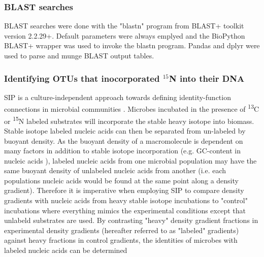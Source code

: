 \subsubsection{BLAST searches}
BLAST searches were done with the "blastn" program from BLAST+ toolkit \cite{20003500} version 2.2.29+. Default parameters were always emplyed and the BioPython \cite{19304878} BLAST+ wrapper was used to invoke the blastn program. Pandas \cite{citeulike:11241428} and dplyr \cite{dplyr} were used to parse and munge BLAST output tables.  

\subsubsection{Identifying OTUs that inocorporated $^{15}$N into their DNA}
SIP is a culture-independent approach towards defining identity-function connections in microbial communities \cite{Buckley_2011, 17446886}. Microbes incubated in the presence of \textsuperscript{13}C or \textsuperscript{15}N labeled substrates will incorporate the stable heavy isotope into biomass. Stable isotope labeled nucleic acids can then be separated from un-labeled by buoyant density. As the buoyant density of a macromolecule is dependent on many factors in addition to stable isotope incorporation (e.g. GC-content in nucleic acids \cite{25139123}), labeled nucleic acids from one microbial population may have the same buoyant density of unlabeled nucleic acids from another (i.e. each populations nucleic acids would be found at the same point along a density gradient). Therefore it is imperative when employing SIP to compare density gradients with nucleic acids from heavy stable isotope incubations to "control" incubations where everything mimics the experimental conditions except that unlabeld substrates are used. By contrasting "heavy" density gradient fractions in experimental density gradients (hereafter referred to as "labeled" gradients) against heavy fractions in control gradients, the identities of microbes with labeled nucleic acids can be determined 

